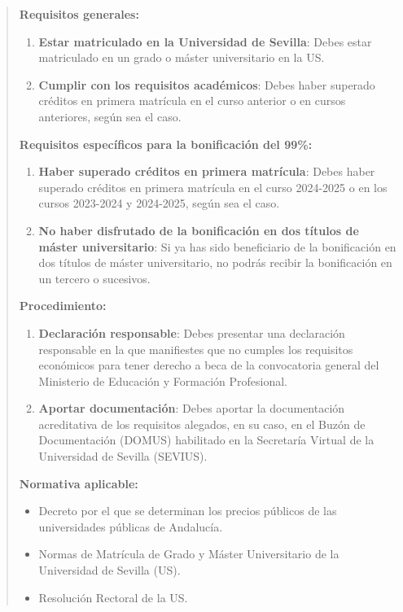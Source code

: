 \documentclass[12pt,a4paper,oneside]{report}
\begin{document}
\begin{itemize}
\begin{itemize}
\begin{quote}
\textbf{Requisitos generales:}

\begin{enumerate}
  \item \textbf{Estar matriculado en la Universidad de Sevilla}: Debes estar matriculado en un grado o máster universitario en la US.
  \item \textbf{Cumplir con los requisitos académicos}: Debes haber superado créditos en primera matrícula en el curso anterior o en cursos anteriores, según sea el caso.
\end{enumerate}

\textbf{Requisitos específicos para la bonificación del 99\%:}

\begin{enumerate}
  \item \textbf{Haber superado créditos en primera matrícula}: Debes haber superado créditos en primera matrícula en el curso 2024-2025 o en los cursos 2023-2024 y 2024-2025, según sea el caso.
  \item \textbf{No haber disfrutado de la bonificación en dos títulos de máster universitario}: Si ya has sido beneficiario de la bonificación en dos títulos de máster universitario, no podrás recibir la bonificación en un tercero o sucesivos.
\end{enumerate}

\textbf{Procedimiento:}

\begin{enumerate}
  \item \textbf{Declaración responsable}: Debes presentar una declaración responsable en la que manifiestes que no cumples los requisitos económicos para tener derecho a beca de la convocatoria general del Ministerio de Educación y Formación Profesional.
  \item \textbf{Aportar documentación}: Debes aportar la documentación acreditativa de los requisitos alegados, en su caso, en el Buzón de Documentación (DOMUS) habilitado en la Secretaría Virtual de la Universidad de Sevilla (SEVIUS).
\end{enumerate}

\textbf{Normativa aplicable:}

\begin{itemize}
  \item Decreto por el que se determinan los precios públicos de las universidades públicas de Andalucía.
  \item Normas de Matrícula de Grado y Máster Universitario de la Universidad de Sevilla (US).
  \item Resolución Rectoral de la US.
\end{itemize}


\end{quote}
\end{itemize}
\end{itemize}
\end{document}
